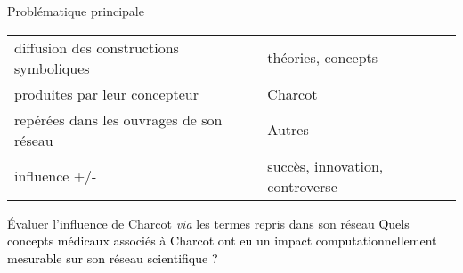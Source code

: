\begin{frame}{Problématique principale}
	
\begin{table}[h]
	\begin{tabular}{ll}
		diffusion des constructions symboliques & théories, concepts \\
		produites par leur concepteur & Charcot\\
		repérées dans les ouvrages de son réseau & Autres \\
		influence +/- & succès, innovation, controverse \\
	\end{tabular}
\end{table}


	\begin{block}{Évaluer l’influence de Charcot \textit{via} les termes repris dans son réseau}
					\centering
					\textcolor{black}{Quels concepts médicaux associés à Charcot ont eu un impact computationnellement mesurable sur son réseau scientifique ?}
				\end{block}

\bigskip
				
\end{frame}